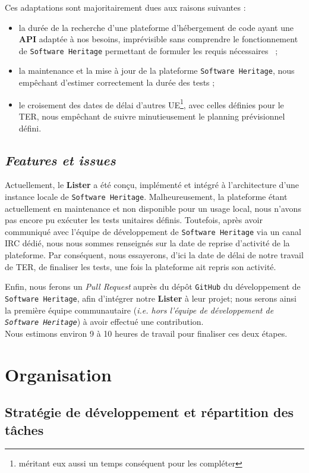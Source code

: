 \documentclass[12pt,a4paper]{report}
\begin{document}
Ces adaptations sont majoritairement dues aux raisons suivantes :
\begin{itemize}
  \item la durée de la recherche d'une plateforme d'hébergement de code ayant une \textbf{API} adaptée à nos besoins, imprévisible sans comprendre le fonctionnement de \texttt{Software Heritage} permettant de formuler les requis nécessaires ~;
  \item la maintenance et la mise à jour de la plateforme \texttt{Software Heritage}, nous empêchant d'estimer correctement la durée des tests ;
  \item le croisement des dates de délai d'autres UE\footnote{méritant eux aussi un temps conséquent pour les compléter}, avec celles définies pour le TER, nous empêchant de suivre minutieusement le planning prévisionnel défini.
\end{itemize}

\section{\textit{Features et issues}}
Actuellement, le \textbf{Lister} a été conçu, implémenté et intégré à l'architecture d'une instance locale de \texttt{Software Heritage}. Malheureusement, la plateforme étant actuellement en maintenance et non disponible pour un usage local, nous n'avons pas encore pu exécuter les tests unitaires définis. Toutefois, après avoir communiqué avec l'équipe de développement de \texttt{Software Heritage} via un canal IRC dédié, nous nous sommes renseignés sur la date de reprise d'activité de la plateforme. Par conséquent, nous essayerons, d'ici la date de délai de notre travail de TER, de finaliser les tests, une fois la plateforme ait repris son activité.

Enfin, nous ferons un \textit{Pull Request} auprès du dépôt \texttt{GitHub} du développement de \texttt{Software Heritage}, afin d'intégrer notre \textbf{Lister} à leur projet; nous serons ainsi la première équipe communautaire (\textit{i.e. hors l'équipe de développement de \texttt{Software Heritage}}) à avoir effectué une contribution.\\
\noindent Nous estimons environ 9 à 10 heures de travail pour finaliser ces deux étapes.

\chapter{Organisation}
\section{Stratégie de développement et répartition des tâches}
\end{document}
